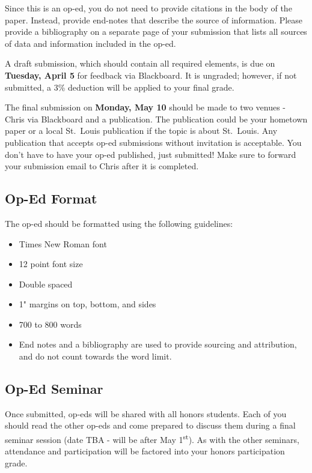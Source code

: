 \documentclass[
]{book}
\providecommand{\tightlist}{%
  \setlength{\itemsep}{0pt}\setlength{\parskip}{0pt}}
\begin{document}
Since this is an op-ed, you do not need to provide citations in the body of the paper. Instead, provide end-notes that describe the source of information. Please provide a bibliography on a separate page of your submission that lists all sources of data and information included in the op-ed.

A draft submission, which should contain all required elements, is due on \textbf{Tuesday, April 5} for feedback via Blackboard. It is ungraded; however, if not submitted, a 3\% deduction will be applied to your final grade.

The final submission on \textbf{Monday, May 10} should be made to two venues - Chris via Blackboard and a publication. The publication could be your hometown paper or a local St.~Louis publication if the topic is about St.~Louis. Any publication that accepts op-ed submissions without invitation is acceptable. You don't have to have your op-ed published, just submitted! Make sure to forward your submission email to Chris after it is completed.

\hypertarget{op-ed-format}{%
\subsection{Op-Ed Format}\label{op-ed-format}}

The op-ed should be formatted using the following guidelines:

\begin{itemize}
\tightlist
\item
  Times New Roman font
\item
  12 point font size
\item
  Double spaced
\item
  1" margins on top, bottom, and sides
\item
  700 to 800 words
\item
  End notes and a bibliography are used to provide sourcing and attribution, and do not count towards the word limit.
\end{itemize}

\hypertarget{op-ed-seminar}{%
\subsection{Op-Ed Seminar}\label{op-ed-seminar}}

Once submitted, op-eds will be shared with all honors students. Each of you should read the other op-eds and come prepared to discuss them during a final seminar session (date TBA - will be after May 1\textsuperscript{st}). As with the other seminars, attendance and participation will be factored into your honors participation grade.
\end{document}
